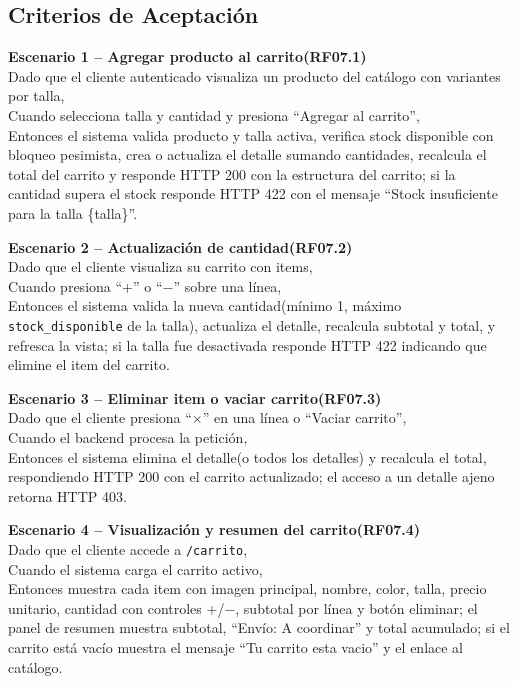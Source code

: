 \documentclass[12pt,a4paper]{article}
\begin{document}
\subsection*{Criterios de Aceptación}

\textbf{Escenario 1 -- Agregar producto al carrito(RF07.1)}\\
Dado que el cliente autenticado visualiza un producto del catálogo con variantes por talla,\\
Cuando selecciona talla y cantidad y presiona ``Agregar al carrito'',\\
Entonces el sistema valida producto y talla activa, verifica stock disponible con bloqueo pesimista, crea o actualiza el detalle sumando cantidades, recalcula el total del carrito y responde HTTP 200 con la estructura del carrito; si la cantidad supera el stock responde HTTP 422 con el mensaje ``Stock insuficiente para la talla \{talla\}''.

\vspace{0.3em}

\textbf{Escenario 2 -- Actualización de cantidad(RF07.2)}\\
Dado que el cliente visualiza su carrito con items,\\
Cuando presiona ``+'' o ``$-$'' sobre una línea,\\
Entonces el sistema valida la nueva cantidad(mínimo 1, máximo \texttt{stock\_disponible} de la talla), actualiza el detalle, recalcula subtotal y total, y refresca la vista; si la talla fue desactivada responde HTTP 422 indicando que elimine el item del carrito.

\vspace{0.3em}

\textbf{Escenario 3 -- Eliminar item o vaciar carrito(RF07.3)}\\
Dado que el cliente presiona ``$\times$'' en una línea o ``Vaciar carrito'',\\
Cuando el backend procesa la petición,\\
Entonces el sistema elimina el detalle(o todos los detalles) y recalcula el total, respondiendo HTTP 200 con el carrito actualizado; el acceso a un detalle ajeno retorna HTTP 403.

\vspace{0.3em}

\textbf{Escenario 4 -- Visualización y resumen del carrito(RF07.4)}\\
Dado que el cliente accede a \texttt{/carrito},\\
Cuando el sistema carga el carrito activo,\\
Entonces muestra cada item con imagen principal, nombre, color, talla, precio unitario, cantidad con controles +/−, subtotal por línea y botón eliminar; el panel de resumen muestra subtotal, ``Envío: A coordinar'' y total acumulado; si el carrito está vacío muestra el mensaje ``Tu carrito esta vacio'' y el enlace al catálogo.
\end{document}
